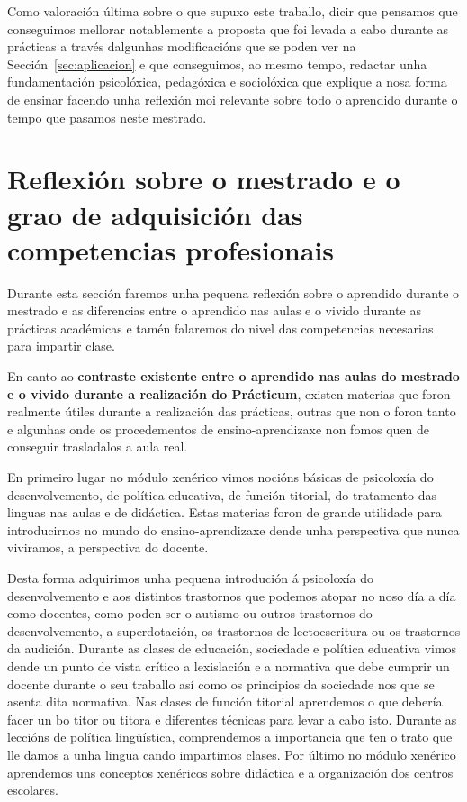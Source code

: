 Como valoración última sobre o que supuxo este traballo, dicir que pensamos que conseguimos mellorar notablemente a proposta que foi levada a cabo durante as prácticas a través dalgunhas modificacións que se poden ver na Sección~\ref{sec:aplicacion} e que conseguimos, ao mesmo tempo, redactar unha fundamentación psicolóxica, pedagóxica e sociolóxica que explique a nosa forma de ensinar facendo unha reflexión moi relevante sobre todo o aprendido durante o tempo que pasamos neste mestrado.

\section{Reflexión sobre o mestrado e o grao de adquisición das competencias profesionais}

Durante esta sección faremos unha pequena reflexión sobre o aprendido durante o mestrado e as diferencias entre o aprendido nas aulas e o vivido durante as prácticas académicas e tamén falaremos do nivel das competencias necesarias para impartir clase.

En canto ao \textbf{contraste existente entre o aprendido nas aulas do mestrado e o vivido durante a realización do Prácticum}, existen materias que foron realmente útiles durante a realización das prácticas, outras que non o foron tanto e algunhas onde os procedementos de ensino-aprendizaxe non fomos quen de conseguir trasladalos a aula real.

En primeiro lugar no módulo xenérico vimos nocións básicas de psicoloxía do desenvolvemento, de política educativa, de función titorial, do tratamento das linguas nas aulas e de didáctica. Estas materias foron de grande utilidade para introducirnos no mundo do ensino-aprendizaxe dende unha perspectiva que nunca viviramos, a perspectiva do docente.

Desta forma adquirimos unha pequena introdución á psicoloxía do desenvolvemento e aos distintos trastornos que podemos atopar no noso día a día como docentes, como poden ser o autismo ou outros trastornos do desenvolvemento, a superdotación, os trastornos de lectoescritura ou os trastornos da audición. Durante as clases de educación, sociedade e política educativa vimos dende un punto de vista crítico a lexislación e a normativa que debe cumprir un docente durante o seu traballo así como os principios da sociedade nos que se asenta dita normativa. Nas clases de función titorial aprendemos o que debería facer un bo titor ou titora e diferentes técnicas para levar a cabo isto. Durante as leccións de política lingüística, comprendemos a importancia que ten o trato que lle damos a unha lingua cando impartimos clases. Por último no módulo xenérico aprendemos uns conceptos xenéricos sobre didáctica e a organización dos centros escolares.

